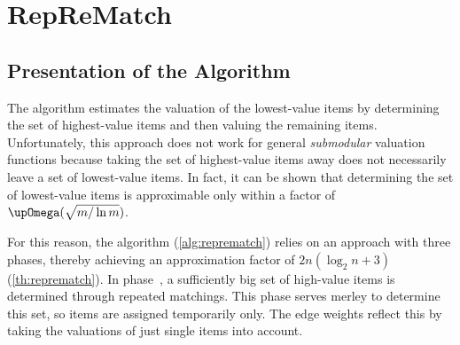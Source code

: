 \section{RepReMatch}
\label{sec:reprematch}

\subsection{Presentation of the Algorithm}
\label{subsec:reprematch:presentation}

The algorithm \SMatch{} estimates the valuation of the lowest-value items by determining the set of highest-value items and then valuing the remaining items.
Unfortunately, this approach does not work for general \emph{submodular} valuation functions because taking the set of highest-value items away does not necessarily leave a set of lowest-value items.
In fact, it can be shown \cite{submodular_low_value} that determining the set of lowest-value items is approximable only within a factor of \(\bigomega(\sqrt{m / \ln m})\).

For this reason, the algorithm \RepReMatch{} (\cref{alg:reprematch}) relies on an approach with three phases, thereby achieving an approximation factor of \(2n(\log_2 n + 3)\) (\cref{th:reprematch}).
In phase~\phasei, a sufficiently big set of high-value items is determined through repeated matchings.
This phase serves merley to determine this set, so items are assigned temporarily only.
The edge weights reflect this by taking the valuations of just single items into account.

